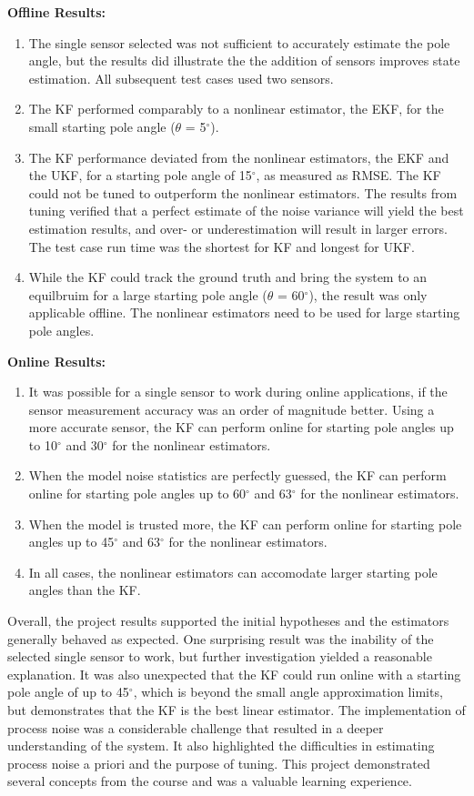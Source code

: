 \documentclass{article}
\begin{document}
\textbf{Offline Results:}
\begin{enumerate}
\item The single sensor selected was not sufficient to accurately estimate the pole angle, but the results did illustrate the the addition of sensors improves state estimation.  All subsequent test cases used two sensors.
\item The KF performed comparably to a nonlinear estimator, the EKF, for the small starting pole angle ($\theta$ = 5$^{\circ}$).
\item The KF performance deviated from the nonlinear estimators, the EKF and the UKF, for a starting pole angle of 15$^{\circ}$, as measured as RMSE.  The KF could not be tuned to outperform the nonlinear estimators.  The results from tuning verified that a perfect estimate of the noise variance will yield the best estimation results, and over- or underestimation will result in larger errors.  The test case run time was the shortest for KF and longest for UKF.
\item While the KF could track the ground truth and bring the system to an equilbruim for a large starting pole angle ($\theta$ = 60$^{\circ}$), the result was only applicable offline.  The nonlinear estimators need to be used for large starting pole angles.
\end{enumerate}

\textbf{Online Results:}
\begin{enumerate}
\item It was possible for a single sensor to work during online applications, if the sensor measurement accuracy was an order of magnitude better.  Using a more accurate sensor, the KF can perform online for starting pole angles up to 10$^{\circ}$ and 30$^{\circ}$ for the nonlinear estimators.
\item When the model noise statistics are perfectly guessed, the KF can perform online for starting pole angles up to 60$^{\circ}$ and 63$^{\circ}$ for the nonlinear estimators.
\item When the model is trusted more, the KF can perform online for starting pole angles up to 45$^{\circ}$ and 63$^{\circ}$ for the nonlinear estimators.
\item In all cases, the nonlinear estimators can accomodate larger starting pole angles than the KF.
\end{enumerate}

Overall, the project results supported the initial hypotheses and the estimators generally behaved as expected.  One surprising result was the inability of the selected single sensor to work, but further investigation yielded a reasonable explanation.  It was also unexpected that the KF could run online with a starting pole angle of up to 45$^{\circ}$, which is beyond the small angle approximation limits, but demonstrates that the KF is the best linear estimator.  The implementation of process noise was a considerable challenge that resulted in a deeper understanding of the system.  It also highlighted the difficulties in estimating process noise a priori and the purpose of tuning.  This project demonstrated several concepts from the course and was a valuable learning experience.
\end{document}
